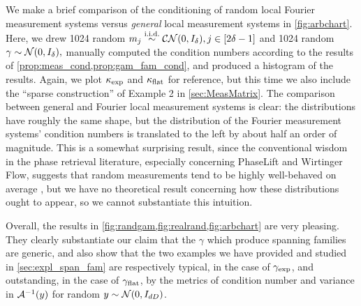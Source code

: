 We make a brief comparison of the conditioning of random local Fourier measurement systems versus \emph{general} local measurement systems in \cref{fig:arbchart}.  Here, we drew 1024 random $m_j \overset{\text{i.i.d.}}{\sim} \mathcal{C N}(0, I_\delta), j \in [2 \delta - 1]$ and 1024 random $\gamma \sim \mathcal{N}(0, I_\delta),$ manually computed the condition numbers according to the results of \cref{prop:meas_cond,prop:gam_fam_cond}, and produced a histogram of the results.  Again, we plot $\kappa_{\rm exp}$ and $\kappa_{\rm flat}$ for reference, but this time we also include the ``sparse construction'' of Example 2 in \cref{sec:MeasMatrix}.  The comparison between general and Fourier local measurement systems is clear: the distributions have roughly the same shape, but the distribution of the Fourier measurement systems' condition numbers is translated to the left by about half an order of magnitude.  This is a somewhat surprising result, since the conventional wisdom in the phase retrieval literature, especially concerning PhaseLift and Wirtinger Flow, suggests that random measurements tend to be highly well-behaved on average \cite{candes2015wtf,candes2011phaselift,kueng2015spherical,kueng2016clifford}, but we have no theoretical result concerning how these distributions ought to appear, so we cannot substantiate this intuition.

Overall, the results in \cref{fig:randgam,fig:realrand,fig:arbchart} are very pleasing.  They clearly substantiate our claim that the $\gamma$ which produce spanning families are generic, and also show that the two examples we have provided and studied in \cref{sec:expl_span_fam} are respectively typical, in the case of $\gamma_{\rm exp}$, and outstanding, in the case of $\gamma_{\rm flat}$, by the metrics of condition number and variance in $\mathcal{A}^{-1}(y)$ for random $y \sim \mathcal{N}(0, I_{d D})$.
